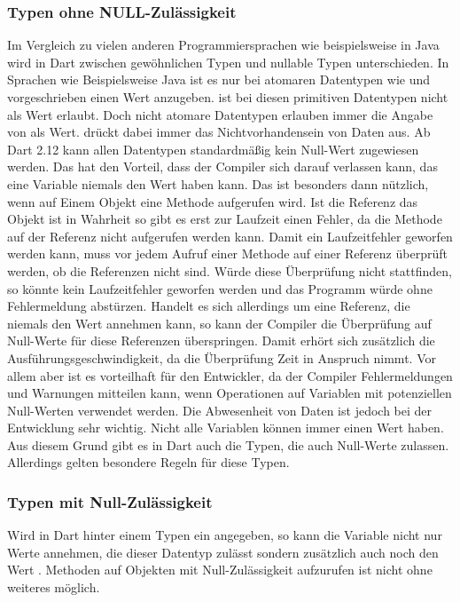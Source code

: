 \subsubsection{Typen ohne NULL-Zulässigkeit} Im Vergleich zu vielen anderen Programmiersprachen wie beispielsweise in Java wird in Dart zwischen gewöhnlichen Typen und nullable Typen unterschieden. In Sprachen wie Beispielsweise Java ist es nur bei atomaren Datentypen wie  und  vorgeschrieben einen Wert anzugeben.  ist bei diesen primitiven Datentypen nicht als Wert erlaubt. Doch nicht atomare Datentypen erlauben immer die Angabe von  als Wert.  drückt dabei immer das Nichtvorhandensein von Daten aus. Ab Dart 2.12   kann allen Datentypen standardmäßig kein Null-Wert zugewiesen werden. Das hat den Vorteil, dass der Compiler sich darauf verlassen kann, das eine Variable niemals den Wert  haben kann. Das ist besonders dann nützlich, wenn auf  Einem Objekt eine Methode aufgerufen wird. Ist die Referenz das Objekt ist in Wahrheit  so gibt es erst zur Laufzeit einen Fehler, da die Methode auf der Referenz  nicht aufgerufen werden kann. Damit ein Laufzeitfehler geworfen werden kann, muss vor jedem Aufruf einer Methode auf einer Referenz überprüft werden, ob die Referenzen nicht  sind. Würde diese Überprüfung nicht stattfinden, so könnte kein Laufzeitfehler geworfen werden und das Programm würde ohne Fehlermeldung abstürzen. Handelt es sich allerdings um eine Referenz, die niemals den Wert  annehmen kann, so kann der Compiler die Überprüfung auf Null-Werte für diese Referenzen überspringen. Damit erhört sich zusätzlich die Ausführungsgeschwindigkeit, da die Überprüfung Zeit in Anspruch nimmt. Vor allem aber ist es vorteilhaft für den Entwickler, da der Compiler  Fehlermeldungen und Warnungen mitteilen kann, wenn Operationen auf Variablen mit potenziellen Null-Werten verwendet werden. Die Abwesenheit von Daten ist jedoch bei der Entwicklung sehr wichtig. Nicht alle Variablen können immer einen Wert haben. Aus diesem Grund gibt es in Dart auch die Typen, die auch Null-Werte zulassen. Allerdings gelten besondere Regeln für diese Typen.

\subsubsection{Typen mit Null-Zulässigkeit}
\label{TypenMitNullZulaessigkeit}

Wird in Dart hinter einem Typen ein  angegeben, so kann die Variable nicht nur  Werte annehmen, die dieser Datentyp zulässt sondern zusätzlich auch noch den Wert . Methoden auf Objekten mit Null-Zulässigkeit aufzurufen ist nicht ohne weiteres möglich.

